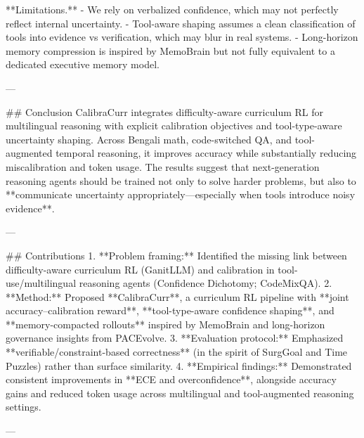 **Limitations.**  
- We rely on verbalized confidence, which may not perfectly reflect internal uncertainty.  
- Tool-aware shaping assumes a clean classification of tools into evidence vs verification, which may blur in real systems.  
- Long-horizon memory compression is inspired by MemoBrain but not fully equivalent to a dedicated executive memory model.

---

## Conclusion  
CalibraCurr integrates difficulty-aware curriculum RL for multilingual reasoning with explicit calibration objectives and tool-type-aware uncertainty shaping. Across Bengali math, code-switched QA, and tool-augmented temporal reasoning, it improves accuracy while substantially reducing miscalibration and token usage. The results suggest that next-generation reasoning agents should be trained not only to solve harder problems, but also to **communicate uncertainty appropriately—especially when tools introduce noisy evidence**.

---

## Contributions  
1. **Problem framing:** Identified the missing link between difficulty-aware curriculum RL (GanitLLM) and calibration in tool-use/multilingual reasoning agents (Confidence Dichotomy; CodeMixQA).  
2. **Method:** Proposed **CalibraCurr**, a curriculum RL pipeline with **joint accuracy–calibration reward**, **tool-type-aware confidence shaping**, and **memory-compacted rollouts** inspired by MemoBrain and long-horizon governance insights from PACEvolve.  
3. **Evaluation protocol:** Emphasized **verifiable/constraint-based correctness** (in the spirit of SurgGoal and Time Puzzles) rather than surface similarity.  
4. **Empirical findings:** Demonstrated consistent improvements in **ECE and overconfidence**, alongside accuracy gains and reduced token usage across multilingual and tool-augmented reasoning settings.

---